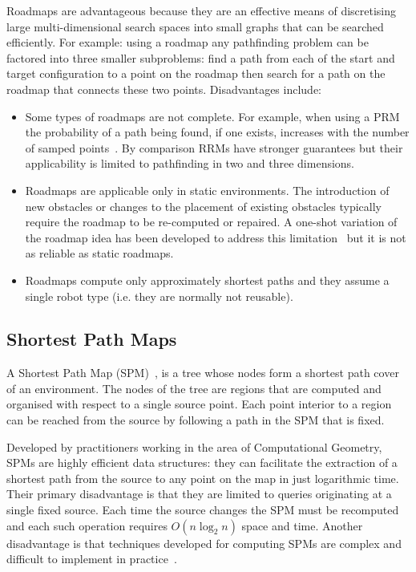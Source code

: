 Roadmaps are advantageous because they are an effective means of discretising
large multi-dimensional search spaces into small graphs that can be searched
efficiently. For example: using a roadmap any pathfinding problem can be
factored into three smaller subproblems: find a path from each of the start and
target configuration to a point on the roadmap then search for a path on the
roadmap that connects these two points. Disadvantages include:
\begin{itemize}
\item{Some types of roadmaps are not complete. For example, when using a PRM the probability of 
a path being found, if one exists, increases with the number  of samped points~\citep{barraquand97}. 
By comparison RRMs have stronger guarantees but their applicability
is limited to pathfinding in two and three dimensions.}
\item{Roadmaps are applicable only in static environments. The introduction of
new obstacles or changes to the placement of existing obstacles typically require 
the roadmap to be re-computed or repaired. A one-shot variation of the roadmap idea has been
developed to address this limitation~\citep{lavalle98} but it is not as reliable
as static roadmaps.}
\item{Roadmaps compute only approximately shortest paths and they assume a single 
robot type (i.e. they are normally not reusable).}
\end{itemize}

\subsection{Shortest Path Maps}
\label{cha::lit::graphs::spm}
A Shortest Path Map (SPM)~\citep{mitchell87,mitchell97}, is a tree whose nodes
form a shortest path cover of an environment.  The nodes of the tree are regions
that are computed and organised with respect to a single source point. Each
point interior to a region can be reached from the source by following a path in
the SPM that is fixed.

Developed by practitioners working in the area of Computational Geometry, SPMs
are highly efficient data structures: they can facilitate the extraction
of a shortest path from the source to any point on the map in just logarithmic time.
Their primary disadvantage is that they are limited to queries originating at
a single fixed source. Each time the source changes the SPM must be recomputed and
each such operation requires $O(n\log_2{n})$ space and time. 
Another disadvantage is that techniques developed for computing SPMs are complex 
and difficult to implement in practice~\citep{surazhsky05}. 

